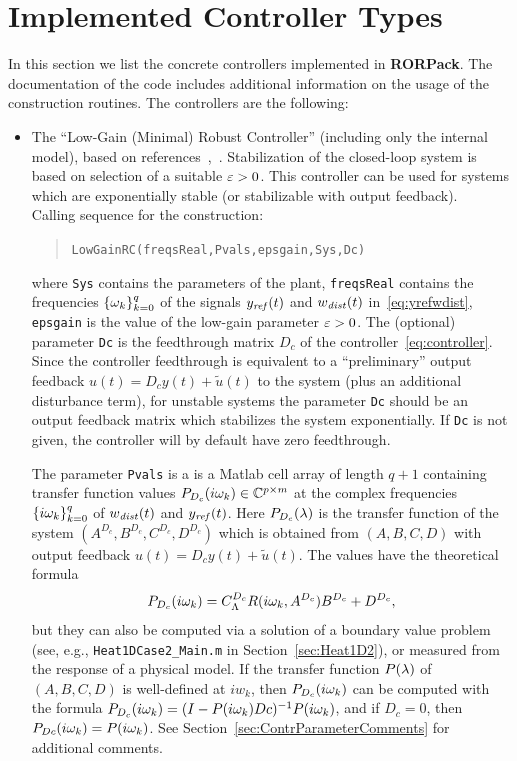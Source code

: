 \documentclass[11pt, a4paper]{amsart}
\newcommand{\CL}{C_\Lambda}
\theoremstyle{definition}
\numberwithin{equation}{section}
\newcommand{\yref}{y_{\mbox{\scriptsize\textit{ref}}}}
\newcommand{\wdist}{w_{\mbox{\scriptsize\textit{dist}}}}
\newcommand{\RORname}{\textbf{RORPack}}
\begin{document}
\section{Implemented Controller Types}
\label{sec:ControllerTypes}

In this section we list the concrete controllers implemented in \RORname.
The documentation of the code includes additional information on the usage of the construction routines.
The controllers are the following:
\begin{itemize}
  \item The ``Low-Gain (Minimal) Robust Controller'' (including only the internal model), based on references~\cite{HamPoh00,RebWei03},~. Stabilization of the closed-loop system is based on selection of a suitable  $\varepsilon>0$. This controller can be used for systems which are exponentially stable (or stabilizable with output feedback).\\[1ex]
      Calling sequence for the construction:\\[-1ex]
     \begin{quotation}
       \texttt{LowGainRC(freqsReal,Pvals,epsgain,Sys,Dc)}
     \end{quotation}
     \medskip
     where \texttt{Sys} contains the parameters of the plant, \texttt{freqsReal} contains the frequencies $\{\omega_k\}_{k=0}^q$ of the signals $\yref(t)$ and $\wdist(t)$ in~\eqref{eq:yrefwdist}, \texttt{epsgain} is the value of the low-gain parameter $\varepsilon>0$. 
The (optional) parameter \texttt{Dc} is the feedthrough matrix $D_c$ of the controller~\eqref{eq:controller}. Since the controller feedthrough 
 is equivalent to a ``preliminary'' output feedback  $u(t)=D_c y(t)+ \tilde{u}(t)$ to the system (plus an additional disturbance term), for unstable systems the parameter \texttt{Dc} should be an output feedback matrix which stabilizes the system exponentially. 
If \texttt{Dc} is not given, the controller will by default have zero feedthrough.

The parameter \texttt{Pvals} is a is a Matlab cell array of length $q+1$ containing transfer function values $P_{D_c}(i\omega_k)\in {\mathbb{C}}^{p\times m}$ at the complex frequencies $\{i\omega_k\}_{k=0}^q$ of $\wdist(t)$ and $\yref(t)$. Here $P_{D_c}(\lambda)$ is the transfer function of the system $(A^{D_c},B^{D_c},C^{D_c},D^{D_c})$ which is obtained from $(A,B,C,D)$ with output feedback $u(t)=D_c y(t)+ \tilde{u}(t)$.
The values have the theoretical formula
 $$P_{D_c}(i\gw_k)=\CL^{D_c} R(i\gw_k,A^{D_c})B^{D_c}+D^{D_c},$$
 but they can also be computed via a solution of a boundary value problem (see, e.g., \texttt{Heat1DCase2\_Main.m} in Section~\ref{sec:Heat1D2}), or measured from the response of a physical model. 
If the
transfer function $P(\lambda)$ of $(A,B,C,D)$ is well-defined at
$iw_k$, then $P_{D_c}(i\omega_k)$ can be computed with the formula 
$P_{D_c}(i\omega_k) = (I-P(i\omega_k)Dc)^{-1} P(i\omega_k)$, and if $D_c=0$, then 
$P_{Dc}(i\omega_k) = P(i\omega_k)$. See Section~\ref{sec:ContrParameterComments} for additional comments.



\end{itemize}
\end{document}
